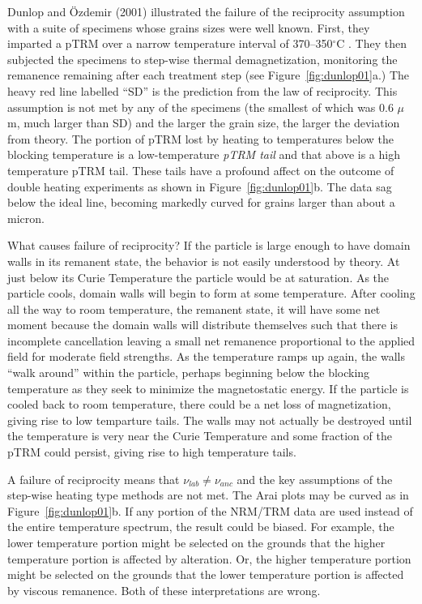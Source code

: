 Dunlop and \"Ozdemir (2001)   illustrated the failure of the  reciprocity assumption with a suite of specimens whose grains sizes were well known.  First, they  imparted a pTRM over a narrow temperature interval of 370--350$^{\circ}$C . They then subjected the specimens to step-wise thermal demagnetization, monitoring the remanence remaining after each treatment step (see Figure~\ref{fig:dunlop01}a.)    The heavy red line labelled ``SD'' is the prediction from the 
law of reciprocity.  This assumption is not met by any of the specimens (the smallest of which was 0.6 $\mu$m,  much larger than SD) and the larger the grain size, the larger the deviation from theory.   The portion of pTRM lost by heating to temperatures below the blocking temperature is a low-temperature 
{\it pTRM tail}  and that above is a high temperature pTRM tail.     These tails have a profound affect on the outcome of double heating  experiments as shown in Figure~\ref{fig:dunlop01}b.    The data sag below the ideal line, becoming markedly curved for  grains larger than about a micron.   


What causes failure of reciprocity?   
If the particle is large enough to have domain walls in its remanent state,   the behavior is  not easily understood by theory.  At just below its Curie Temperature  the particle would be at saturation.    As the particle cools,  domain walls will begin to form at some temperature.  After cooling all the way to room temperature, the  remanent state, it  will have some net moment because the domain walls will distribute themselves such that there is incomplete cancellation leaving a small net remanence proportional to the applied field for moderate field strengths.  As the temperature ramps up again, the walls  ``walk around'' within the particle, perhaps beginning below the blocking temperature as they seek to minimize the magnetostatic energy.  If the particle is cooled back to room temperature, there could be  a net loss of magnetization, giving rise to low temparture tails.  The walls may  not actually be destroyed until the  temperature is very near the Curie Temperature and some fraction of the pTRM could persist,  giving rise to high temperature tails.  


A failure of reciprocity means that $\nu_{lab} \neq \nu_{anc}$ and the key assumptions of the step-wise heating type methods are not met.  The  Arai plots  may be curved as in Figure~\ref{fig:dunlop01}b.   If any portion of the NRM/TRM data are used  instead of the entire temperature spectrum, the result could be biased.  For example,  the lower temperature portion might be selected on the grounds that the higher temperature portion is affected by alteration. Or, the higher temperature portion might be selected on the grounds that the lower temperature portion is affected by viscous remanence.  Both of these interpretations are  wrong.   


